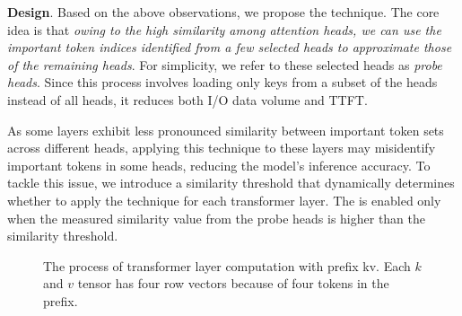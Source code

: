 



\textbf{Design}. Based on the above observations, we propose the \techa{} technique. The core idea is that \textit{owing to the high similarity among attention heads, we can use the important token indices identified from a few selected heads to approximate those of the remaining heads}. For simplicity, we refer to these selected heads as \textit{probe heads}. Since this process involves loading only keys from a subset of the heads instead of all heads, it reduces both I/O data volume and TTFT.

As some layers exhibit less pronounced similarity between important token
sets across different heads, applying this technique to these layers may
misidentify important tokens in some heads, reducing the model's
inference accuracy. To tackle this issue, we introduce a similarity threshold
that dynamically determines whether to apply the technique
for each transformer layer.
The \techa{} is enabled only when the measured similarity value from the probe heads 
is higher than the similarity threshold.

\begin{figure}
	\centering
	\vspace{-0.1in}
	\caption{The process of transformer layer computation with prefix kv. Each \(k\) and \(v\) tensor has four row vectors because of four tokens in the prefix.}
	\label{fig:woandw-techa}
	\vspace{-0.1in}
\end{figure}



